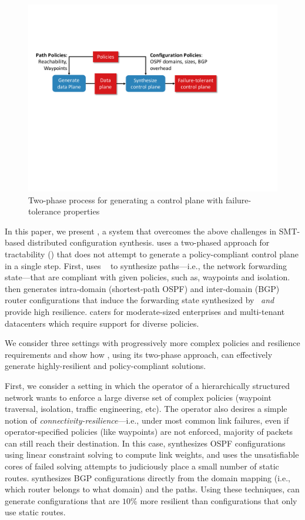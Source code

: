 \begin{figure}
	\includegraphics[width=0.7\columnwidth]{figures/architecture.pdf}
	\caption{Two-phase process for generating a control plane
		with failure-tolerance properties}
	\label{fig:architecture}
\end{figure}

In this paper, we present \name, a system that overcomes the above
challenges in SMT-based distributed configuration synthesis.  \name
uses a two-phased approach for tractability ()
that does not attempt to generate a policy-compliant control plane in
a single step.  First, \name uses \genesis~\cite{genesis} to
synthesize paths---i.e., the network forwarding state---that are
compliant with given policies, such as, waypoints and isolation.
\name then generates intra-domain (shortest-path OSPF) and
inter-domain (BGP) router configurations that induce the forwarding
state synthesized by \genesis\ {\em and} provide high resilience. \name 
caters for moderate-sized enterprises and multi-tenant datacenters 
which require support for diverse policies.

We consider three settings with progressively more complex policies
and resilience requirements and show how \name, using its two-phase
approach, can effectively generate highly-resilient and
policy-compliant solutions.

First, we consider a setting in which the operator of a hierarchically
structured network wants to enforce a large diverse set of complex
policies (waypoint traversal, isolation, traffic engineering, etc).
The operator also desires a simple notion of
\emph{connectivity-resilience}---i.e., under most common
link failures, even if operator-specified policies (like waypoints)
are not enforced, majority of packets can still reach their destination.  In this
case, \name synthesizes OSPF configurations using linear constraint
solving to compute link weights, and uses the unsatisfiable cores of
failed solving attempts to judiciously place a small number of static
routes.  \name synthesizes BGP configurations directly from the domain
mapping (i.e., which router belongs to what domain) and the paths.
Using these techniques, \name can generate configurations that are
$10\%$ more resilient than configurations that only use static routes.

